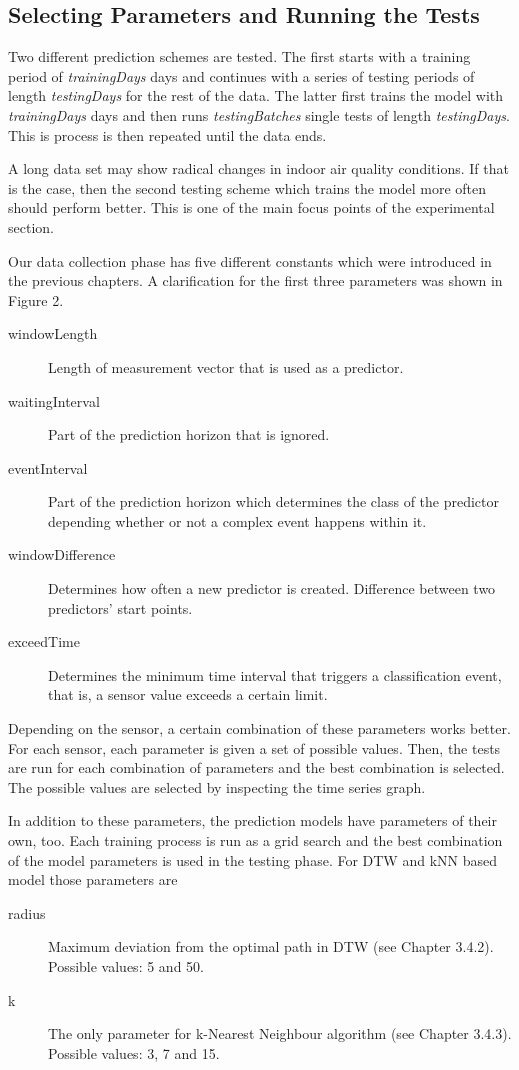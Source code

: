 \subsection{Selecting Parameters and Running the Tests}

Two different prediction schemes are tested. The first starts with a training period of \emph{trainingDays} days and continues with a series of testing periods of length \emph{testingDays} for the rest of the data. The latter first trains the model with \emph{trainingDays} days and then runs \emph{testingBatches} single tests of length \emph{testingDays}. This is process is then repeated until the data ends. 

A long data set may show radical changes in indoor air quality conditions. If that is the case, then the second testing scheme which trains the model more often should perform better. This is one of the main focus points of the experimental section.

Our data collection phase has five different constants which were introduced in the previous chapters. A clarification for the first three parameters was shown in Figure 2.

\begin{description}
\item[windowLength]{Length of measurement vector that is used as a predictor.}
\item[waitingInterval]{Part of the prediction horizon that is ignored.}
\item[eventInterval]{Part of the prediction horizon which determines the class of the predictor depending whether or not a complex event happens within it.}
\item[windowDifference]{Determines how often a new predictor is created. Difference between two predictors' start points.}
\item[exceedTime]{Determines the minimum time interval that triggers a classification event, that is, a sensor value exceeds a certain limit.}
\end{description}

Depending on the sensor, a certain combination of these parameters works better. For each sensor, each parameter is given a set of possible values. Then, the tests are run for each combination of parameters and the best combination is selected. The possible values are selected by inspecting the time series graph.

In addition to these parameters, the prediction models have parameters of their own, too. Each training process is run as a grid search and the best combination of the model parameters is used in the testing phase. For DTW and kNN based model those parameters are
\begin{description}
\item[radius]{Maximum deviation from the optimal path in DTW (see Chapter 3.4.2). Possible values: 5 and 50.}
\item[k]{The only parameter for k-Nearest Neighbour algorithm (see Chapter 3.4.3). Possible values: 3, 7 and 15.}
\end{description}

